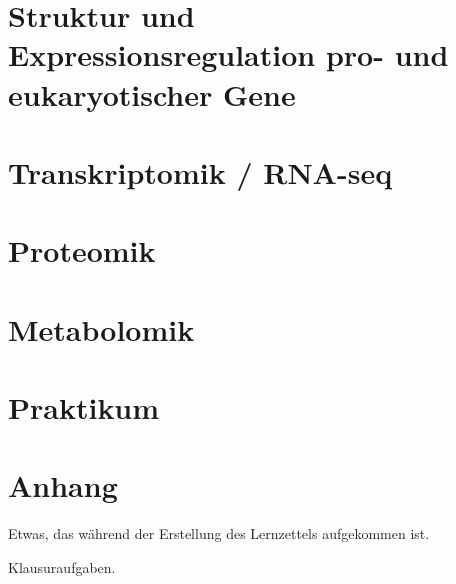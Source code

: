 \chapter{Struktur und Expressionsregulation pro- und eukaryotischer Gene}


\chapter{Transkriptomik / RNA-seq}
 

\chapter{Proteomik} 


\chapter{Metabolomik} 


\chapter{Praktikum} 

 
  
\chapter{Anhang}
\begin{mybox}[title=Frage oder Konzept]
Etwas, das während der Erstellung des Lernzettels aufgekommen ist.
\end{mybox} 
\begin{mechanism}[title=Frage oder Aufgabe]
Klausuraufgaben.
\end{mechanism}
\printindex
\newpage
{}
\printglossary
{}
\listoffigures
{}
\listoftables

